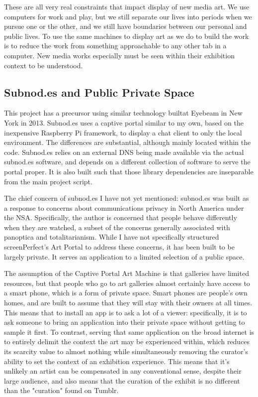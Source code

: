  These are all very real constraints that impact display of new media art. We use computers for work and play, but we still separate our lives into periods when we pursue one or the other, and we still have boundaries between our personal and public lives. To use the same machines to display art as we do to build the work is to reduce the work from something approachable to any other tab in a computer. New media works especially must be seen within their exhibition context to be understood.

\subsection{Subnod.es and Public Private Space}
This project has a precursor using similar technology builtat Eyebeam in New York in 2013. Subnod.es uses a captive portal similar to my own, based on the inexpensive Raspberry Pi framework, to display a chat client to only the local environment. The differences are substantial, although mainly located within the code. Subnod.es relies on an external DNS being made available via the actual subnod.es software, and depends on a different collection of software to serve the portal proper. It is also built such that those library dependencies are inseparable from the main project script.

The chief concern of subnod.es I have not yet mentioned: subnod.es was built as a response to concerns about communications privacy in North America under the NSA. Specifically, the author is concerned that people behave differently when they are watched, a subset of the concerns generally associated with panoptica and totalitarianism. While I have not specifically structured screenPerfect's Art Portal to address these concerns, it has been built to be largely private. It serves an application to a limited selection of a public space.

The assumption of the Captive Portal Art Machine is that galleries have limited resources, but that people who go to art galleries almost certainly have access to a smart phone, which is a form of private space. Smart phones are people's own homes, and are built to assume that they will stay with their owners at all times. This means that to install an app is to ask a lot of a viewer: specifically, it is to ask someone to bring an application into their private space without getting to sample it first. To contrast, serving that same application on the broad internet is to entirely delimit the context the art may be experienced within, which reduces its scarcity value to almost nothing while simultaneously removing the curator's ability to set the context of an exhibition experience. This means that it's unlikely an artist can be compensated in any conventional sense, despite their large audience, and also means that the curation of the exhibit is no different than the "curation" found on Tumblr.

